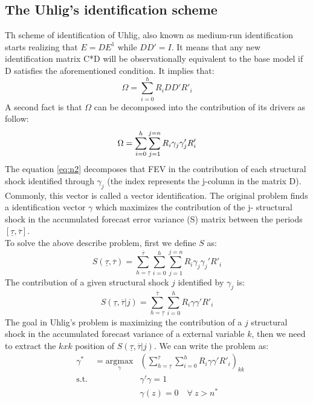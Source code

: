 \documentclass[12pt, a4paper]{article}
\begin{document}
\subsection{The Uhlig's identification scheme}
Th scheme of identification of Uhlig, also known as medium-run identification starts realizing that $E = D E^1$ while $DD' = I$. It means that any new identification matrix C*D will be observationally equivalent to the base model if D satisfies the aforementioned condition. It implies that:
\begin{equation*}
	 \Omega = \sum_{i=0}^h R_{i}D D' R'_{i}
\end{equation*}
A second fact is that $\Omega$ can be decomposed into the contribution of  its drivers as follow:
\begin{equation}{\label{eq:n2}}
	 \Omega = \sum_{i=0}^h \sum_{j=1}^{j=n} R_{i}\gamma_j \gamma_j' R'_{i}
\end{equation}
The equation \ref{eq:n2} decomposes that FEV in the contribution of each structural shock identified through $\gamma_j$ (the index represents the j-column in the matrix D). Commonly, this vector is called a vector identification. The original problem finds a identification vector $\gamma$ which maximizes the contribution of the j- structural shock in the accumulated forecast error variance (S) matrix between the periods $[\underline{\tau}, \overline{\tau}]$.\\
To solve the above describe problem, first we define $S$ as:
\begin{equation}
	 S(\underline{\tau},\overline{\tau}) =  \sum_{h = \underline{\tau}}^{\overline{\tau}}\sum_{i=0}^h \sum_{j=1}^{j=n} R_{i}\gamma_j \gamma_j' R'_{i}
\end{equation}
The contribution of a given structural shock $j$ identified by $\gamma_j$ is:
\begin{equation}
S(\underline{\tau},\overline{\tau}|j) =  \sum_{h = \underline{\tau}}^{\overline{\tau}}\sum_{i=0}^h R_{i}\gamma \gamma' R'_{i}
\end{equation}
The goal in Uhlig's problem is maximizing the contribution of a $j$ structural shock in the accumulated forecast variance of a external variable $k$, then we need to extract the $kxk$ position of $S(\underline{\tau},\overline{\tau}|j)$. We can write the problem as:
\begin{equation}\label{eq:n1}
\begin{aligned}
& \gamma^* &= \underset{\gamma}{\text{argmax}} 
& \left(\sum_{h = \underline{\tau}}^{\overline{\tau}}\sum_{i=0}^h R_{i}\gamma \gamma' R'_{i} \right)_{kk}\\
& \text{s.t.} 
&  & \gamma' \gamma = 1 \\
&  & & \gamma(z)  = 0 \quad \forall \ z>n^*
\end{aligned}
\end{equation}
\end{document}
